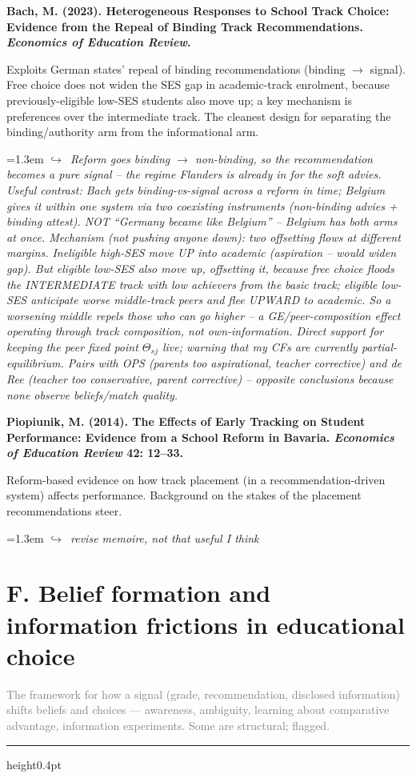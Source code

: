 \documentclass[11pt]{article}
\newcommand{\entry}[3]{%
  \par\medskip\noindent\textbf{#1}\par
  \nopagebreak #2\hspace{0.35em}{\small\color{tagcol}[#3]}\par}
\newcommand{\note}[1]{\par\smallskip\noindent\hangindent=1.3em
  \textcolor{notecol}{\footnotesize$\hookrightarrow$~\textit{#1}}}
\newcommand{\secintro}[1]{\par\smallskip\noindent\textcolor{grey}{\small #1}\par
  \vspace{2pt}\hrule height0.4pt\vspace{4pt}}
\begin{document}
\entry{Bach, M. (2023). Heterogeneous Responses to School Track Choice: Evidence from
the Repeal of Binding Track Recommendations. \textit{Economics of Education Review}.}
{Exploits German states' repeal of binding recommendations (binding $\to$ signal). Free
choice does not widen the SES gap in academic-track enrolment, because previously-eligible
low-SES students also move up; a key mechanism is preferences over the intermediate
track. The cleanest design for separating the binding/authority arm from the
informational arm.}{RF}
\note{Reform goes binding $\to$ non-binding, so the recommendation becomes a pure signal --
the regime Flanders is already in for the soft \emph{advies}. Useful contrast: Bach gets
binding-vs-signal \emph{across a reform in time}; Belgium gives it \emph{within one system}
via two coexisting instruments (non-binding advies + binding attest). NOT ``Germany became
like Belgium'' -- Belgium has both arms at once. Mechanism (not pushing anyone down): two
offsetting flows at different margins. Ineligible high-SES move UP into academic (aspiration
-- would widen gap). But eligible low-SES \emph{also} move up, offsetting it, because free
choice floods the INTERMEDIATE track with low achievers from the basic track; eligible
low-SES anticipate worse middle-track peers and flee UPWARD to academic. So a worsening
middle \emph{repels} those who can go higher -- a GE/peer-composition effect operating
through track composition, not own-information. Direct support for keeping the peer fixed
point $\Theta_{sj}$ live; warning that my CFs are currently partial-equilibrium. Pairs with
OPS (parents too aspirational, teacher corrective) and de Ree (teacher too conservative,
parent corrective) -- opposite conclusions because none observe beliefs/match quality.}


\entry{Piopiunik, M. (2014). The Effects of Early Tracking on Student Performance:
Evidence from a School Reform in Bavaria. \textit{Economics of Education Review} 42:
12--33.}
{Reform-based evidence on how track placement (in a recommendation-driven system)
affects performance. Background on the stakes of the placement recommendations steer.}{RF}
\note{revise memoire, not that useful I think}


\section{F. Belief formation and information frictions in educational choice}
\secintro{The framework for how a signal (grade, recommendation, disclosed information)
shifts beliefs and choices --- awareness, ambiguity, learning about comparative advantage,
information experiments. Some are structural; flagged.}
\end{document}
